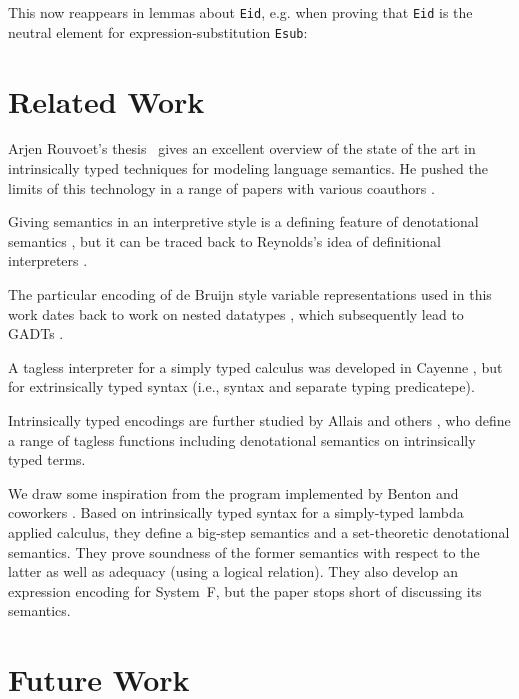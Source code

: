 \documentclass[acmsmall,anonymous,review,screen]{acmart}
\begin{document}
This {\Asubst} now reappears in lemmas about \texttt{Eid}, e.g. when proving
that \texttt{Eid} is the neutral element for expression-substitution \texttt{Esub}:
\SubstExamplesEidNeutral




\section{Related Work}
\label{sec:related-work}

Arjen Rouvoet's thesis~\cite{DBLP:phd/basesearch/Rouvoet21} gives an
excellent overview of the state of the art in intrinsically typed
techniques for modeling language semantics. He pushed the limits of
this technology in a range of papers with various coauthors
\cite{DBLP:journals/pacmpl/RestPRVM22,DBLP:journals/pacmpl/RouvoetKV21,DBLP:conf/cpp/RouvoetPKV20,DBLP:journals/pacmpl/PoulsenRTKV18}. 

Giving semantics in an interpretive style is a defining feature of
denotational semantics \cite{Schmidt1986}, but it can be traced back
to Reynolds's idea of definitional interpreters \cite{Reynolds1975}.

The particular encoding of de Bruijn style variable representations
used in this work dates back to work on nested datatypes
\cite{DBLP:conf/mpc/BirdM98,DBLP:journals/jfp/BirdP99,DBLP:conf/csl/AltenkirchR99},
which subsequently lead to GADTs
\cite{cheney03:_first_class_phant_types}.

A tagless interpreter for a simply typed calculus was developed in
Cayenne \cite{augustsson99}, but for extrinsically typed syntax (i.e.,
syntax and separate typing predicatepe).

Intrinsically typed encodings are further studied by Allais and others
\cite{DBLP:conf/cpp/Allais0MM17}, who define a range of tagless
functions including denotational semantics on intrinsically typed
terms. 

We draw some inspiration from the program implemented by Benton and coworkers
\cite{DBLP:journals/jar/BentonHKM12}. Based on intrinsically typed
syntax for a simply-typed lambda applied calculus, they define a
big-step semantics and a set-theoretic denotational semantics. They
prove soundness of the former semantics with respect to the latter as
well as adequacy (using a logical relation). They also develop an
expression encoding for System~F, but the paper stops short of
discussing its semantics. 

\section{Future Work}
\label{sec:future-work}
\end{document}
